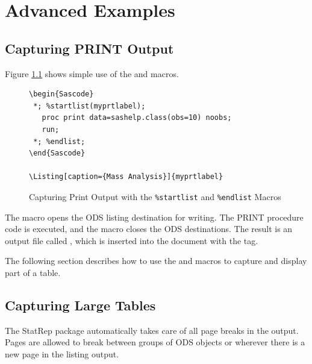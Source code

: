 \documentclass[article,oneside]{memoir}
\newcommand*{\StatRep}{\textsf{StatRep}\xspace}
\begin{document}
\chapter{Advanced Examples}


\section{Capturing PRINT Output}
  Figure \ref{printoutput} shows simple use of the  and 
  macros.

\begin{figure}[H]
\begin{snugshade}
\begin{verbatim}
\begin{Sascode}
 *; %startlist(myprtlabel);
   proc print data=sashelp.class(obs=10) noobs;
   run;
 *; %endlist;
\end{Sascode}

\Listing[caption={Mass Analysis}]{myprtlabel}
\end{verbatim}
\end{snugshade}
\caption{Capturing Print Output with the \texttt{\%startlist} and
\texttt{\%endlist} Macros}\label{printoutput}
\end{figure}

  The  macro opens the ODS listing destination for writing.
  The PRINT procedure code is executed, and the  macro closes the ODS destinations.
  The result is an output file called , which is
  inserted into the document with the  tag.

  The following section describes how to use the  and 
  macros to capture and display part of a table.


\section{Capturing Large Tables}\label{large}

  The \StatRep package automatically takes care of all page breaks in the output.
  Pages are allowed to break between groups of ODS objects or wherever there is a new page
  in the listing output.
\end{document}
